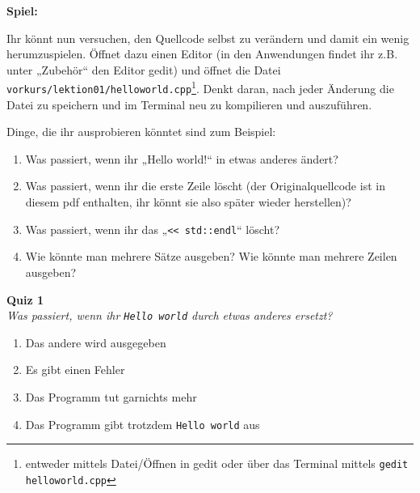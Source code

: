 \textbf{Spiel:}

Ihr könnt nun versuchen, den Quellcode selbst zu verändern und damit ein wenig
herumzuspielen. Öffnet dazu einen Editor (in den Anwendungen findet ihr z.B.
unter „Zubehör“ den Editor gedit) und öffnet die Datei
\texttt{vorkurs/lektion01/helloworld.cpp}\footnote{entweder mittels
\glqq{}Datei/Öffnen\grqq{} in gedit oder über das Terminal mittels \texttt{gedit
helloworld.cpp}}. Denkt daran, nach jeder Änderung die Datei zu speichern und
im Terminal neu zu kompilieren und auszuführen.

Dinge, die ihr ausprobieren könntet sind zum Beispiel:
\begin{enumerate}
    \item Was passiert, wenn ihr „Hello world!“ in etwas anderes ändert?
    \item Was passiert, wenn ihr die erste Zeile löscht (der Originalquellcode
        ist in diesem pdf enthalten, ihr könnt sie also später wieder
        herstellen)?
    \item Was passiert, wenn ihr das „\verb|<< std::endl|“ löscht?
    \item Wie könnte man mehrere Sätze ausgeben? Wie könnte man mehrere Zeilen
        ausgeben?
\end{enumerate}

\textbf{Quiz 1}\\
\textit{Was passiert, wenn ihr \texttt{Hello world} durch etwas anderes ersetzt?}
\begin{enumerate}[label=\alph]
    \item Das andere wird ausgegeben
    \item Es gibt einen Fehler
    \item Das Programm tut garnichts mehr
    \item Das Programm gibt trotzdem \texttt{Hello world} aus
\end{enumerate}
